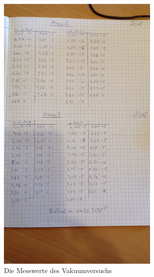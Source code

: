 \begin{figure}[h]
    \centering
    \includegraphics[width=0.7\textwidth]{latex/images/Messwerte_5.jpeg}
    \caption{Die Messwerte des Vakuumversuchs}
\end{figure}


